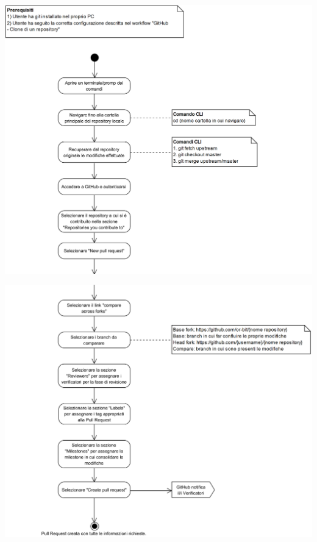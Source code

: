 \begin{center}
	\includegraphics[width=15cm]{../../documenti/NormeDiProgetto/DiagrammiProcedure/GitHub-CreazionePullRequest1.png}
\end{center}


\begin{center}
	\includegraphics[width=15cm]{../../documenti/NormeDiProgetto/DiagrammiProcedure/GitHub-CreazionePullRequest2.png}
\end{center}

